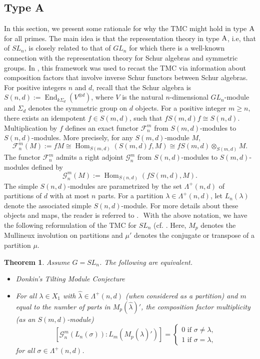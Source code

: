 \documentclass[twoside,11pt,reqno]{amsart}
\newcommand{\Hom}{\ensuremath{\operatorname{Hom}}}
\newcommand{\End}{\ensuremath{\operatorname{End}}}
\newcommand{\0}{\bar 0}
\newcommand{\1}{\bar 1}
\newcommand{\si}{\sigma}
\newcommand{\la}{\lambda}
\newcommand{\fmn}{{\mathcal F}^m_n}
\newcommand{\gmn}{{\mathcal G}^m_n}
\newtheorem{theorem}{Theorem}[subsection]
\theoremstyle{definition}
\numberwithin{equation}{subsection}
\begin{document}
\subsection{Type A}\label{SS:TypeA} In this section, we present some rationale for why the TMC might hold in type $\rm{A}$ for all primes. The main idea is that the representation theory in type $\rm{A}$, i.e, that of $SL_n$, is closely related to that of $GL_n$ for which there is a well-known connection with the representation theory for Schur algebras and symmetric groups. In \cite{BNPS26}, this framework was used to recast the TMC via information about composition factors that involve inverse Schur functors between Schur algebras. 
﻿
For positive integers $n$ and $d$, recall that the Schur algebra is $S(n,d) := \End_{k\Sigma_d}(V^{\otimes d})$, where $V$ is the natural $n$-dimensional $GL_n$-module and $\Sigma_d$ denotes the symmetric group on $d$ objects.  For a positive integer $m \geq n$, there exists an idempotent $f \in S(m,d)$, such that $fS(m,d)f \cong S(n,d)$. Multiplication by $f$ defines an exact functor ${\mathcal F}_{n}^{m}$ from $S(m,d)$-modules to  $S(n,d)$-modules.  More precisely, for any $S(m,d)$-module $M$,
$$
\fmn(M) := fM \cong \Hom_{S(m,d)}(S(m,d)f,M) \cong fS(m,d)\otimes_{S(m,d)}M.
$$
The functor $\fmn$ admits a right adjoint $\gmn$ from $S(n,d)$-modules to $S(m,d)$-modules defined by 
$$
\gmn(M) := \Hom_{S(n,d)}(fS(m,d),M).
$$
The simple $S(n,d)$-modules are parametrized by the set $\Lambda^+(n,d)$ of partitions of $d$ with at most $n$ parts.  For a partition $\la \in \Lambda^+(n,d)$, let $L_n(\la)$ denote the associated simple $S(n,d)$-module.  For more details about these objects and maps, the reader is referred to \cite[Section 2.2]{BNPS26}. 
﻿
With the above notation, we have the following reformulation of the TMC for $SL_n$ (cf. \cite[Corollary 5.3.3]{BNPS26}. Here, $M_{p}$ denotes the Mullineux involution on partitions and $\mu'$ denotes the conjugate or transpose of a partition $\mu$.
﻿
\begin{theorem}\label{T:TMCequivG} Assume $G = SL_n$.  The following are equivalent. 
\begin{itemize} 
\item[(a)] Donkin's Tilting Module Conjecture
\item[(b)] For all $\la \in X_1$ with $\hat{\la} \in \Lambda^+(n,d)$ (when considered as a partition) and $m$ equal to the number of parts in $M_p(\hat{\la})'$, the composition factor multiplicity (as an $S(m,d)$-module)
$$
\left[\gmn(L_n(\si)) : L_m(M_p(\hat{\la})')\right] = 
\begin{cases}
0 \text{ if } \si \neq \la,\\
1 \text{ if } \si = \la,
\end{cases}
$$
for all $\si \in \Lambda^+(n,d)$.
\end{itemize} 
\end{theorem}
\end{document}
